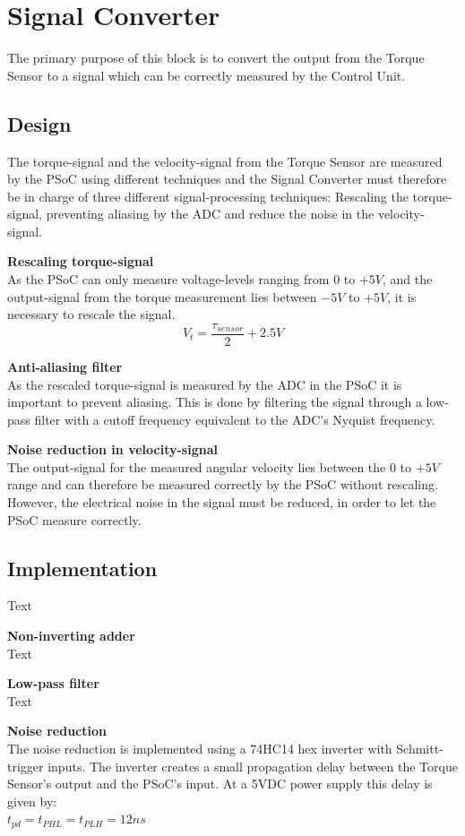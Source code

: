 \section{Signal Converter}
The primary purpose of this block is to convert the output from the Torque Sensor to a signal which can be correctly measured by the Control Unit.

\subsection{Design}
The torque-signal and the velocity-signal from the Torque Sensor are measured by the PSoC using different techniques and the Signal Converter must therefore be in charge of three different signal-processing techniques: Rescaling the torque-signal, preventing aliasing by the ADC and reduce the noise in the velocity-signal.

\textbf{Rescaling torque-signal}\\
As the PSoC can only measure voltage-levels ranging from $0$ to $+5 V$, and the output-signal from the torque measurement lies between $-5 V$ to $+5 V$, it is necessary to rescale the signal.
\begin{equation}
	V_t = \frac{\tau_{sensor} }{2} + 2.5 V
\end{equation}

\textbf{Anti-aliasing filter}\\
As the rescaled torque-signal is measured by the ADC in the PSoC it is important to prevent aliasing. This is done by filtering the signal through a low-pass filter with a cutoff frequency equivalent to the ADC's Nyquist frequency.

\textbf{Noise reduction in velocity-signal}\\
The output-signal for the measured angular velocity lies between the $0$ to $+5 V$ range and can therefore be measured correctly by the PSoC without rescaling. However, the electrical noise in the signal must be reduced, in order to let the PSoC measure correctly.

\subsection{Implementation}
Text

\textbf{Non-inverting adder}\\
Text

\textbf{Low-pass filter}\\
Text

\textbf{Noise reduction}\\
The noise reduction is implemented using a 74HC14 hex inverter with Schmitt-trigger inputs. The inverter creates a small propagation delay between the Torque Sensor's output and the PSoC's input. At a 5VDC power supply this delay is given by:\\
$t_{pd} = t_{PHL} = t_{PLH} = 12 ns$


